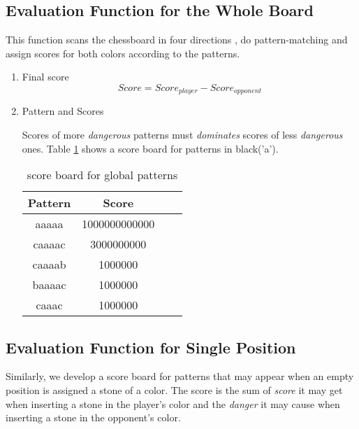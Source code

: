 \documentclass[conference]{IEEEtran}
\begin{document}
\subsection{Evaluation Function for the Whole Board}
This function scans the chessboard in four directions , do pattern-matching and assign scores for both colors according to the patterns. 
\begin{enumerate}
	\item Final score 
	$$ Score = Score_{player} - Score_{opponent}$$
	\item Pattern and Scores
	
	Scores of more \emph{dangerous} patterns must \emph{dominates} scores of less \emph{dangerous} ones. Table \ref{table:1} shows a score board for patterns in black('a').

	\begin{table}[htb]
	\caption{score board for global patterns}
	\centering
    \begin{tabular}{cccc}
    \toprule
    Pattern&Score\\
    \midrule
	aaaaa&1000000000000\\
	caaaac&3000000000\\
	caaaab&1000000\\
	baaaac&1000000\\
	caaac&1000000\\
	\bottomrule
	\end{tabular}
	\label{table:1}
	\end{table}
\end{enumerate}
\subsection{Evaluation Function for Single Position}
Similarly, we develop a score board for patterns that may appear when an empty position is assigned a stone of a color. The score is the sum of \emph{score} it may get when inserting a stone in the player's color and the \emph{danger} it may cause when inserting a stone in the opponent's color.
\end{document}
